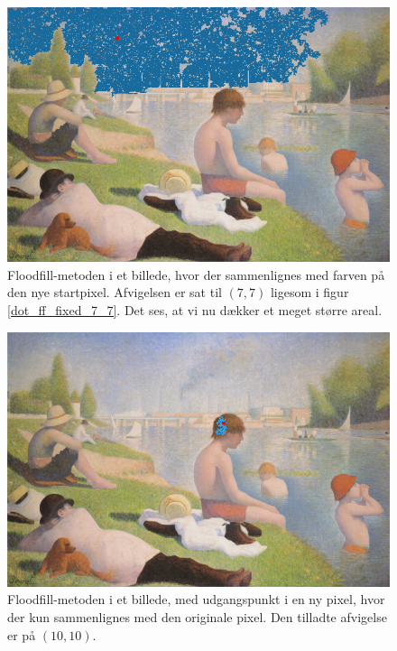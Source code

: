 {\begin{figure}[!h]
    \begin{center}
        \includegraphics[scale=0.49]{afsnit/vores_implementation/billeder/flood_fill/dot_ff_var_7_7}
    \end{center}
    \caption[]{Floodfill-metoden i et billede, hvor der sammenlignes med
    farven på den nye startpixel. Afvigelsen er sat til $(7,7)$ ligesom
    i figur \ref{dot_ff_fixed_7_7}. Det ses, at vi nu dækker et meget
    større areal.}
    \label{dot_ff_var_7_7}
\end{figure}

\begin{figure}[!h]
    \begin{center}
        \includegraphics[scale=0.49]{afsnit/vores_implementation/billeder/flood_fill/dot_ff_fixed_10_10}
    \end{center}
    \caption[]{Floodfill-metoden i et billede, med udgangspunkt i en ny
    pixel, hvor der kun sammenlignes med den originale pixel. Den
    tilladte afvigelse er på $(10,10)$.}
    \label{dot_ff_fixed_10_10}
\end{figure}

}
